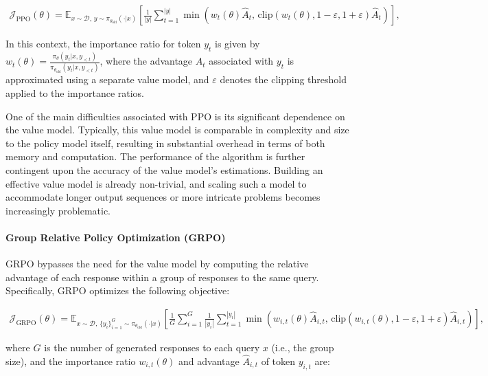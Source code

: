 \begin{align}
\mathcal{J}_\text{PPO}(\theta) = \mathbb{E}_{ x \sim \mathcal{D},\, y \sim \pi_{\theta_\text{old}}( \cdot | x) }
\left[ \frac{1}{|y|} \sum_{t=1}^{|y|} 
\min \left( w_{t}(\theta) \widehat{A}_{t},  \, \mathrm{clip} \left( w_{t}(\theta), 1 - {\varepsilon}, 1 + {\varepsilon}\right) \widehat{A}_{t} \right)
\right],
\end{align}

In this context, the importance ratio for token $y_t$ is given by $
w_{t}(\theta) = \frac{ \pi_{\theta} (y_{t} | x, y_{<t}) }{ \pi_{\theta_\text{old}} (y_{t} | x,y_{<t})} $, where the advantage $\widehat{A}_{t}$ associated with $y_t$ is approximated using a separate value model, and $\varepsilon$ denotes the clipping threshold applied to the importance ratios.

One of the main difficulties associated with PPO is its significant dependence on the value model. Typically, this value model is comparable in complexity and size to the policy model itself, resulting in substantial overhead in terms of both memory and computation. The performance of the algorithm is further contingent upon the accuracy of the value model’s estimations. Building an effective value model is already non-trivial, and scaling such a model to accommodate longer output sequences or more intricate problems becomes increasingly problematic.

\paragraph{Group Relative Policy Optimization (GRPO)} GRPO \citep{grpo} bypasses the need for the value model by computing the relative advantage of each response within a group of responses to the same query. Specifically, GRPO optimizes the following objective:

\begin{align}
\label{equ:grpo}
\mathcal{J}_\text{GRPO}(\theta) = \mathbb{E}_{ x \sim \mathcal{D},\, \{y_i\}_{i=1}^G \sim \pi_{\theta_\text{old}}( \cdot | x) }
\left[ \frac{1}{G} \sum_{i=1}^{G} \frac{1}{|y_i|} \sum_{t=1}^{|y_i|} 
\min \left( w_{i,t}(\theta) \widehat{A}_{i,t},  \, \mathrm{clip} \left( w_{i,t}(\theta), 1 - {\varepsilon}, 1 + {\varepsilon}\right) \widehat{A}_{i,t} \right)
\right],
\end{align}

where $G$ is the number of generated responses to each query $x$ (i.e., the group size), and the importance ratio $w_{i,t}(\theta)$ and advantage $\widehat{A}_{i,t}$ of token $y_{i,t}$ are:

